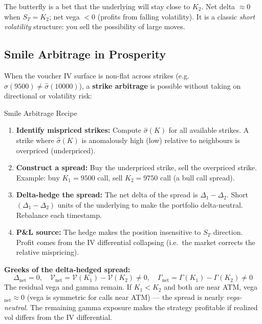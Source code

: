 \documentclass[12pt,a4paper,openany]{report}
\theoremstyle{definition}
\begin{document}
The butterfly is a bet that the underlying will stay close to $K_2$. Net delta $\approx 0$ when $S_T = K_2$; net vega $< 0$ (profits from falling volatility). It is a classic \emph{short volatility} structure: you sell the possibility of large moves.

\subsection{Smile Arbitrage in Prosperity}

When the voucher IV surface is non-flat across strikes (e.g.\ $\hat{\sigma}(9500) \neq \hat{\sigma}(10000)$), a \textbf{strike arbitrage} is possible without taking on directional or volatility risk:

\begin{keyconceptbox}{Smile Arbitrage Recipe}
\begin{enumerate}[label=\arabic*.]
  \item \textbf{Identify mispriced strikes:} Compute $\hat{\sigma}(K)$ for all available strikes. A strike where $\hat{\sigma}(K)$ is anomalously high (low) relative to neighbours is overpriced (underpriced).
  \item \textbf{Construct a spread:} Buy the underpriced strike, sell the overpriced strike. Example: buy $K_1 = 9500$ call, sell $K_2 = 9750$ call (a bull call spread).
  \item \textbf{Delta-hedge the spread:} The net delta of the spread is $\Delta_1 - \Delta_2$. Short $(\Delta_1 - \Delta_2)$ units of the underlying to make the portfolio delta-neutral. Rebalance each timestamp.
  \item \textbf{P\&L source:} The hedge makes the position insensitive to $S_T$ direction. Profit comes from the IV differential collapsing (i.e.\ the market corrects the relative mispricing).
\end{enumerate}

\textbf{Greeks of the delta-hedged spread:}
\[
  \Delta_{\text{net}} = 0,\quad
  \mathcal{V}_{\text{net}} = \mathcal{V}(K_1) - \mathcal{V}(K_2) \neq 0,\quad
  \Gamma_{\text{net}} = \Gamma(K_1) - \Gamma(K_2) \neq 0
\]
The residual vega and gamma remain. If $K_1 < K_2$ and both are near ATM, vega$_{\text{net}} \approx 0$ (vega is symmetric for calls near ATM) — the spread is nearly \emph{vega-neutral}. The remaining gamma exposure makes the strategy profitable if realized vol differs from the IV differential.
\end{keyconceptbox}
\end{document}
